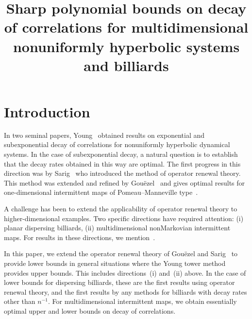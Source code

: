 \documentclass[AHL,Unicode,longabstracts,published]{cedram}
\title[Sharp polynomial bounds on decay of correlations]{Sharp polynomial bounds on decay of correlations for multidimensional nonuniformly hyperbolic systems and billiards}
\author[\initial{H.} \lastname{Bruin}]{\firstname{Henk} \lastname{Bruin}}
\author[\initial{I.} \lastname{Melbourne}]{\firstname{Ian} \lastname{Melbourne}}
\author[\initial{D.} \lastname{Terhesiu}]{\firstname{Dalia} \lastname{Terhesiu}}
\begin{document}
\maketitle


\section{Introduction}

In two seminal papers, Young~\cite{Young98,Young99} obtained results on exponential and subexponential decay of correlations for nonuniformly hyperbolic dynamical systems. In the case of subexponential decay, a natural question is to establish that the decay rates obtained in this way are optimal. The first progress in this direction was by Sarig~\cite{Sarig02} who introduced the method of operator renewal theory. This method was extended and refined by Gou\"ezel~\cite{Gouezel04a} and gives optimal results for one-dimensional intermittent maps of Pomeau--Manneville type~\cite{PomeauManneville80,Thaler80}.

A challenge has been to extend the applicability of operator renewal theory to higher-dimensional examples. Two specific directions have required attention: (i) planar dispersing billiards, (ii) multidimensional nonMarkovian intermittent maps. For results in these directions, we mention~\cite{HuVaientiapp,VaientiZhangsub}.

In this paper, we extend the operator renewal theory of Gou\"ezel and Sarig~\cite{Gouezel04a,Sarig02} to provide lower bounds in general situations where the Young tower method \cite{Young99} provides upper bounds. This includes directions~(i) and~(ii) above. In the case of lower bounds for dispersing billiards, these are the first results using operator renewal theory, and the first results by any methods for billiards with decay rates other than $n^{-1}$. For multidimensional intermittent maps, we obtain essentially optimal upper and lower bounds on decay of correlations.
\end{document}
